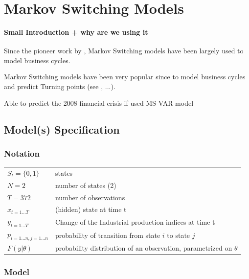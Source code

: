 \documentclass[12pt,a4paper,oneside]{book}
\begin{document}
\chapter{Markov Switching Models}


\subsubsection{Small Introduction + why are we using it}

Since the pioneer work by \cite{hamilton_new_1989}, Markov Switching models have been largely used to model business cycles.


Markov Switching models have been very popular since \cite{hamilton_new_1989} to model business cycles and predict Turning points (see \cite{duprey_how_2017}, ...).

Able to predict the 2008 financial crisis if used MS-VAR model \cite{gadea_rivas_failure_2015}




\section{Model(s) Specification}

\subsection{Notation}

\begin{tabular}{l l}
    $S_t = \{0, 1\}$&   states        \\
    $N = 2$         &   number of states (2) \\
    $T = 372 $            & 	number of observations  \\
    $x_{t=1\dots T}$ & (hidden) state at time t \\
    $y_{t=1\dots T}$ 	& Change of the Industrial production indices at time t \\
    $p_{i=1\dots n,j=1\dots n}$ & probability of transition from state $i$ to state $j$ \\
    $F(y|\theta )$	&  probability distribution of an observation, parametrized on $\theta$ \\
\end{tabular}



\subsection{Model}
\end{document}
